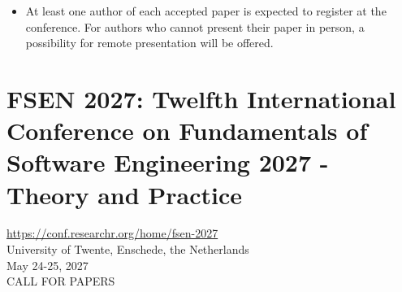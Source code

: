 \documentclass[prodmode,acmtecs]{acmsmall} %
\begin{document}
\begin{itemize}
  There will be a rebuttal period for authors. Authors will receive the reviews of their submissions and have a few days to prepare and submit rebuttals. These rebuttals become part of the PC discussions, but entail no specific responses. Rebuttals will be handled through EasyChair.                                                      
 
\item  At least one author of each accepted paper is expected to register at the conference. For authors who cannot present their paper in person, a possibility for remote presentation will be offered.    
 
\end{itemize}\section{FSEN 2027: Twelfth International Conference on Fundamentals of Software Engineering 2027 - Theory and Practice}\label{FSEN2027}  \href{https://conf.researchr.org/home/fsen-2027}{https://conf.researchr.org/home/fsen-2027}\\ 
  University of Twente, Enschede, the Netherlands\\ 
  May 24-25, 2027\\ 
CALL FOR PAPERS  
\end{document}
